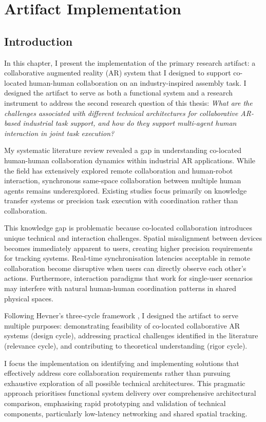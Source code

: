 \chapter{Artifact Implementation}\label{chapter:artifact-implementation}

\section{Introduction}
In this chapter, I present the implementation of the primary research artifact: a collaborative augmented reality (AR) system that I designed to support co-located human-human collaboration on an industry-inspired assembly task. I designed the artifact to serve as both a functional system and a research instrument to address the second research question of this thesis: \emph{What are the challenges associated with different technical architectures for collaborative AR-based industrial task support, and how do they support multi-agent human interaction in joint task execution?}

My systematic literature review revealed a gap in understanding co-located human-human collaboration dynamics within industrial AR applications. While the field has extensively explored remote collaboration and human-robot interaction, synchronous same-space collaboration between multiple human agents remains underexplored. Existing studies focus primarily on knowledge transfer systems or precision task execution with coordination rather than collaboration.

This knowledge gap is problematic because co-located collaboration introduces unique technical and interaction challenges. Spatial misalignment between devices becomes immediately apparent to users, creating higher precision requirements for tracking systems. Real-time synchronisation latencies acceptable in remote collaboration become disruptive when users can directly observe each other's actions. Furthermore, interaction paradigms that work for single-user scenarios may interfere with natural human-human coordination patterns in shared physical spaces.

Following Hevner's three-cycle framework \cite{hevner2007dsr}, I designed the artifact to serve multiple purposes: demonstrating feasibility of co-located collaborative AR systems (design cycle), addressing practical challenges identified in the literature (relevance cycle), and contributing to theoretical understanding (rigor cycle).

I focus the implementation on identifying and implementing solutions that effectively address core collaboration requirements rather than pursuing exhaustive exploration of all possible technical architectures. This pragmatic approach prioritises functional system delivery over comprehensive architectural comparison, emphasising rapid prototyping and validation of technical components, particularly low-latency networking and shared spatial tracking.

